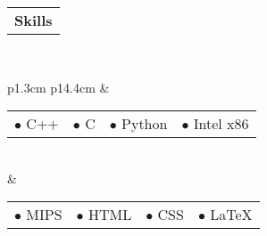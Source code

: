 \documentclass[12pt]{article}
\begin{document}
 \raggedright{\begin{tabular}[b]{p{5.5cm}}
	\bf{\Large{Skills}} \\
    \cline{1-1}
\end{tabular}} \\ \smallskip \smallskip \smallskip \smallskip \smallskip
\begin{tabular}[b]{p{1.3cm} p{14.4cm}}
	&\begin{tabular}[b]{p{2.8cm} p{2.8cm} p{2.8cm} p{2.8cm}}
    $\bullet$ C++ & $\bullet$ C & $\bullet$ Python & $\bullet$ Intel x86
    \end{tabular} \medskip \\
    &\begin{tabular}[b]{p{2.8cm} p{2.8cm} p{2.8cm} p{2.8cm}}
    $\bullet$ MIPS & $\bullet$ HTML & $\bullet$ CSS & $\bullet$ \LaTeX
    \end{tabular} \medskip \\

\end{tabular}\\ \bigskip \bigskip
\end{document}
